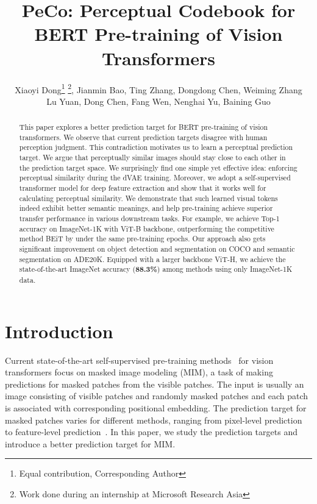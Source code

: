 \documentclass[letterpaper]{article} \usepackage{aaai23}  \usepackage{times}  \usepackage{helvet}  \usepackage{courier}  \usepackage[hyphens]{url}  \usepackage{graphicx} \urlstyle{rm} \def\UrlFont{\rm}  \usepackage{natbib}  \usepackage{caption} \frenchspacing  \setlength{\pdfpagewidth}{8.5in}  \setlength{\pdfpageheight}{11in}  \usepackage{algorithm}
\title{PeCo: Perceptual Codebook for BERT Pre-training of Vision Transformers}
\author{Xiaoyi Dong\thanks{Equal contribution,  Corresponding Author}  \thanks{Work done during an internship at Microsoft Research Asia}, Jianmin Bao,  Ting Zhang,  Dongdong Chen,  Weiming Zhang \\   Lu Yuan,  Dong Chen, Fang Wen,   Nenghai Yu, Baining Guo\\}
\begin{document}
\maketitle

\begin{abstract}
This paper explores a better prediction target for  BERT pre-training of vision transformers. 
We observe that current prediction targets disagree with human perception judgment.
This contradiction motivates us to learn a perceptual prediction target.
We argue that perceptually similar images should stay close to each other in the prediction target space. 
We surprisingly find one simple yet effective idea: enforcing perceptual similarity during the dVAE training. 
Moreover, we adopt a self-supervised transformer model for deep feature extraction and show that it works well for calculating perceptual similarity.
We demonstrate that such learned visual tokens indeed exhibit better semantic meanings, and help pre-training achieve superior transfer performance in various downstream tasks. For example, we achieve  Top-1 accuracy on ImageNet-1K with ViT-B backbone, outperforming the competitive method BEiT by  under the same pre-training epochs. Our approach also gets significant improvement on object detection and segmentation on COCO and semantic segmentation on ADE20K. Equipped with a larger backbone ViT-H, we achieve the state-of-the-art ImageNet accuracy (\textbf{88.3\%}) among methods using only ImageNet-1K data.
\end{abstract}
\section{Introduction}

\label{sec:intro}




Current state-of-the-art self-supervised pre-training methods~\cite{dosovitskiy2020image,bao2021beit,he2021masked,xie2021simmim,chen2022context,wei2021masked} for vision transformers focus on masked image modeling (MIM),
a task of making predictions for masked patches from the visible patches. The input is usually an image consisting of visible patches and randomly masked patches and each patch is associated with corresponding positional embedding.
The prediction target for masked patches varies for different methods,
ranging from pixel-level prediction~\cite{dosovitskiy2020image,he2021masked,xie2021simmim} to feature-level prediction~\cite{bao2021beit,chen2022context,wei2021masked}.
In this paper, we study the prediction targets and introduce a better prediction target for MIM. 
\end{document}

